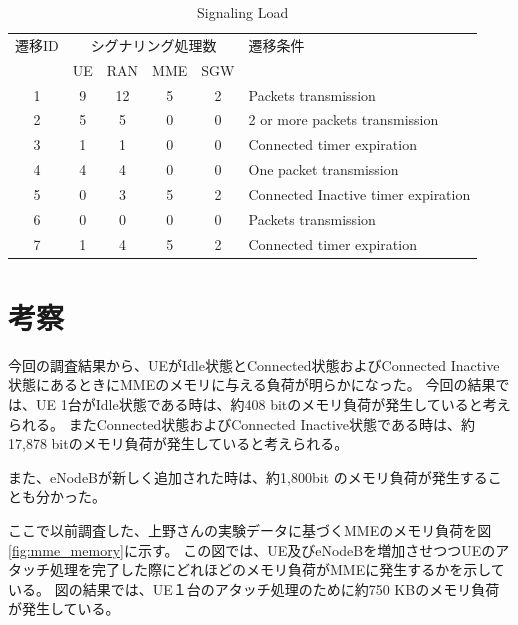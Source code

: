 \documentclass[a4j]{ujarticle}
\begin{document}
\begin{table}[htbp]
  \centering
  \caption{Signaling Load}
  \label{table:signalings_all}
  \begin{tabular}{c|cccc|l}
    \hline
    遷移ID  & \multicolumn{4}{|c|}{シグナリング処理数} & 遷移条件                          \\
            & UE      & RAN     & MME     & SGW      &                                   \\ \hline \hline
    1       & 9       & 12      & 5       & 2        & Packets transmission              \\
    2       & 5       & 5       & 0       & 0        & 2 or more packets transmission    \\
    3       & 1       & 1       & 0       & 0        & Connected timer expiration        \\
    4       & 4       & 4       & 0       & 0        & One packet transmission           \\
    5       & 0       & 3       & 5       & 2        & Connected Inactive timer expiration             \\
    6       & 0       & 0       & 0       & 0        & Packets transmission              \\
    7       & 1       & 4       & 5       & 2        & Connected timer expiration            \\ \hline
  \end{tabular}
\end{table}



\section{考察}
今回の調査結果から、UEがIdle状態とConnected状態およびConnected Inactive状態にあるときにMMEのメモリに与える負荷が明らかになった。
今回の結果では、UE 1台がIdle状態である時は、約408 bitのメモリ負荷が発生していると考えられる。
またConnected状態およびConnected Inactive状態である時は、約17,878 bitのメモリ負荷が発生していると考えられる。

また、eNodeBが新しく追加された時は、約1,800bit のメモリ負荷が発生することも分かった。

ここで以前調査した、上野さんの実験データに基づくMMEのメモリ負荷を図\ref{fig:mme_memory}に示す。
この図では、UE及びeNodeBを増加させつつUEのアタッチ処理を完了した際にどれほどのメモリ負荷がMMEに発生するかを示している。
図の結果では、UE１台のアタッチ処理のために約750 KBのメモリ負荷が発生している。
\end{document}
